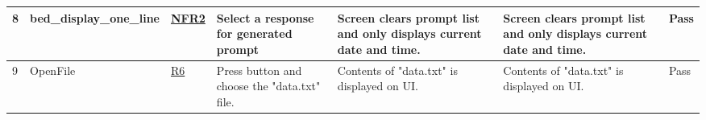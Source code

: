 \documentclass[12pt, titlepage]{article}
\begin{document}
\begin{center}
\begin{table}
\begin{tabular}{ | p{0.5cm} | p{2.8cm} |  p{1.1cm} | p{2.7cm} | p{2.7cm} | p{2.7cm} | p{1.1cm} |}
\hline
8 & bed\_display\newline \_one\_line & \href{https://github.com/zakerl/Capstone_Project/blob/main/docs/SRS/SRS.pdf}{NFR2} & Select a response for generated prompt & Screen clears prompt list and only displays current date and time. & Screen clears prompt list and only displays current date and time. & Pass \\ 
\hline
9 & OpenFile & \href{https://github.com/zakerl/Capstone_Project/blob/main/docs/SRS/SRS.pdf}{R6} & Press button and choose the "data.txt" file. & Contents of "data.txt" is displayed on UI. & Contents of "data.txt" is displayed on UI.  & Pass \\ 
\hline
\end{tabular}
\end{table}
\end{center}
\end{document}
